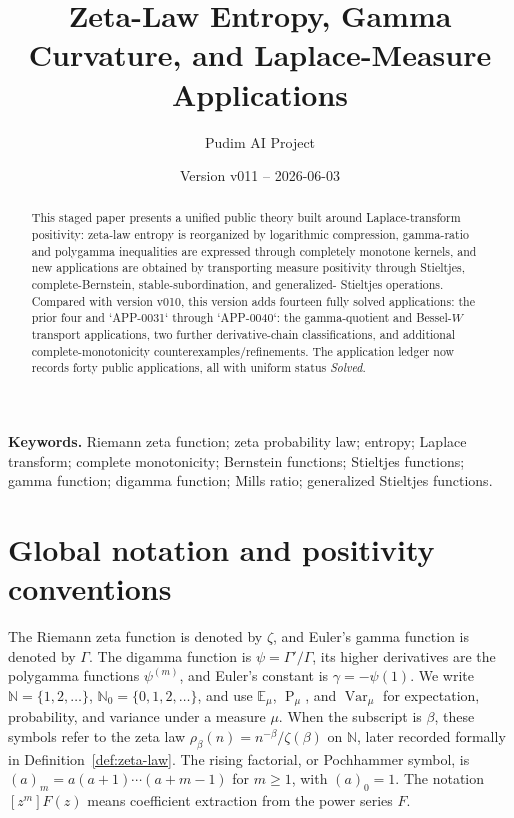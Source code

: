 \documentclass[11pt]{article}
\title{Zeta-Law Entropy, Gamma Curvature, and Laplace-Measure Applications}
\author{Pudim AI Project}
\date{Version v011 -- 2026-06-03}
\numberwithin{equation}{section}
\theoremstyle{definition}
\theoremstyle{remark}
\DeclareMathOperator{\Var}{Var}
\DeclareMathOperator{\Prob}{P}
\newcommand{\E}{\mathbb E}
\newcommand{\N}{\mathbb N}
\newcommand{\1}{\mathbf 1}
\begin{document}
\maketitle

\begin{abstract}
This staged paper presents a unified public theory built around Laplace-transform
positivity: zeta-law entropy is reorganized by logarithmic compression,
gamma-ratio and polygamma inequalities are expressed through completely monotone
kernels, and new applications are obtained by transporting measure positivity
through Stieltjes, complete-Bernstein, stable-subordination, and generalized-
Stieltjes operations.  Compared with version v010, this version adds fourteen
fully solved applications: the prior four and `APP-0031` through `APP-0040`:
the gamma-quotient and Bessel-\(W\) transport applications, two further
derivative-chain classifications, and additional complete-monotonicity
counterexamples/refinements.  The application ledger now records forty public
applications, all with uniform status
\emph{Solved}.
\end{abstract}

\noindent\textbf{Keywords.} Riemann zeta function; zeta probability law; entropy; Laplace transform; complete monotonicity; Bernstein functions; Stieltjes functions; gamma function; digamma function; Mills ratio; generalized Stieltjes functions.

\section{Global notation and positivity conventions}
\label{sec:global-notation-positivity}

The Riemann zeta function is denoted by \(\zeta\), and Euler's gamma
function is denoted by \(\Gamma\).  The digamma function is
\(\psi=\Gamma'/\Gamma\), its higher derivatives are the polygamma functions
\(\psi^{(m)}\), and Euler's constant is \(\gamma=-\psi(1)\).  We write
\(\N=\{1,2,\ldots\}\), \(\mathbb N_0=\{0,1,2,\ldots\}\), and use
\(\E_\mu\), \(\Prob_\mu\), and \(\Var_\mu\) for expectation, probability, and
variance under a measure \(\mu\).  When the subscript is \(\beta\), these
symbols refer to the zeta law \(\rho_\beta(n)=n^{-\beta}/\zeta(\beta)\) on
\(\N\), later recorded formally in Definition~\ref{def:zeta-law}.  The rising factorial, or Pochhammer symbol, is
\((a)_m=a(a+1)\cdots(a+m-1)\) for \(m\ge1\), with \((a)_0=1\).  The notation
\([z^m]F(z)\) means coefficient extraction from the power series \(F\).
\end{document}
